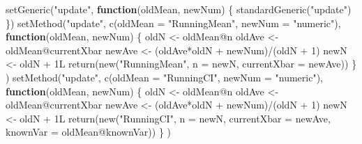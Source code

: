 \documentclass[
  12pt,
  krantz2]{krantz}
\makeatletter
\newenvironment{Shaded}{\begin{snugshade}}{\end{snugshade}}
\newcommand{\AttributeTok}[1]{\textcolor[rgb]{0.61,0.61,0.61}{#1}}
\newcommand{\ControlFlowTok}[1]{\textcolor[rgb]{0.27,0.27,0.27}{\textbf{#1}}}
\newcommand{\DecValTok}[1]{\textcolor[rgb]{0.06,0.06,0.06}{#1}}
\newcommand{\FunctionTok}[1]{\textcolor[rgb]{0,0,0}{#1}}
\newcommand{\NormalTok}[1]{#1}
\newcommand{\OtherTok}[1]{\textcolor[rgb]{0.37,0.37,0.37}{#1}}
\newcommand{\SpecialCharTok}[1]{\textcolor[rgb]{0,0,0}{#1}}
\newcommand{\StringTok}[1]{\textcolor[rgb]{0.5,0.5,0.5}{#1}}
\newenvironment{kframe}{%
\medskip{}
\setlength{\fboxsep}{.8em}
 \def\at@end@of@kframe{}%
 \ifinner\ifhmode%
  \def\at@end@of@kframe{\end{minipage}}%
  \begin{minipage}{\columnwidth}%
 \fi\fi%
 \def\FrameCommand##1{\hskip\@totalleftmargin \hskip-\fboxsep
 \colorbox{shadecolor}{##1}\hskip-\fboxsep
     \hskip-\linewidth \hskip-\@totalleftmargin \hskip\columnwidth}%
 \MakeFramed {\advance\hsize-\width
   \@totalleftmargin\z@ \linewidth\hsize
   \@setminipage}}%
 {\par\unskip\endMakeFramed%
 \at@end@of@kframe}
\renewenvironment{Shaded}{\begin{kframe}}{\end{kframe}}
\makeatother
\begin{document}
\begin{Shaded}
\begin{Highlighting}[]
\FunctionTok{setGeneric}\NormalTok{(}\StringTok{"update"}\NormalTok{, }\ControlFlowTok{function}\NormalTok{(oldMean, newNum) \{}
  \FunctionTok{standardGeneric}\NormalTok{(}\StringTok{"update"}\NormalTok{)}
\NormalTok{\})}
\FunctionTok{setMethod}\NormalTok{(}\StringTok{"update"}\NormalTok{,}
          \FunctionTok{c}\NormalTok{(}\AttributeTok{oldMean =} \StringTok{"RunningMean"}\NormalTok{, }\AttributeTok{newNum =} \StringTok{"numeric"}\NormalTok{),}
          \ControlFlowTok{function}\NormalTok{(oldMean, newNum) \{}
\NormalTok{            oldN }\OtherTok{\textless{}{-}}\NormalTok{ oldMean}\SpecialCharTok{@}\NormalTok{n}
\NormalTok{            oldAve }\OtherTok{\textless{}{-}}\NormalTok{ oldMean}\SpecialCharTok{@}\NormalTok{currentXbar}
\NormalTok{            newAve }\OtherTok{\textless{}{-}}\NormalTok{ (oldAve}\SpecialCharTok{*}\NormalTok{oldN }\SpecialCharTok{+}\NormalTok{ newNum)}\SpecialCharTok{/}\NormalTok{(oldN }\SpecialCharTok{+} \DecValTok{1}\NormalTok{)}
\NormalTok{            newN }\OtherTok{\textless{}{-}}\NormalTok{ oldN }\SpecialCharTok{+}\NormalTok{ 1L}
            \FunctionTok{return}\NormalTok{(}\FunctionTok{new}\NormalTok{(}\StringTok{"RunningMean"}\NormalTok{, }\AttributeTok{n =}\NormalTok{ newN, }\AttributeTok{currentXbar =}\NormalTok{ newAve))}
\NormalTok{          \}}
\NormalTok{)}
\FunctionTok{setMethod}\NormalTok{(}\StringTok{"update"}\NormalTok{,}
          \FunctionTok{c}\NormalTok{(}\AttributeTok{oldMean =} \StringTok{"RunningCI"}\NormalTok{, }\AttributeTok{newNum =} \StringTok{"numeric"}\NormalTok{),}
          \ControlFlowTok{function}\NormalTok{(oldMean, newNum) \{}
\NormalTok{            oldN }\OtherTok{\textless{}{-}}\NormalTok{ oldMean}\SpecialCharTok{@}\NormalTok{n}
\NormalTok{            oldAve }\OtherTok{\textless{}{-}}\NormalTok{ oldMean}\SpecialCharTok{@}\NormalTok{currentXbar}
\NormalTok{            newAve }\OtherTok{\textless{}{-}}\NormalTok{ (oldAve}\SpecialCharTok{*}\NormalTok{oldN }\SpecialCharTok{+}\NormalTok{ newNum)}\SpecialCharTok{/}\NormalTok{(oldN }\SpecialCharTok{+} \DecValTok{1}\NormalTok{)}
\NormalTok{            newN }\OtherTok{\textless{}{-}}\NormalTok{ oldN }\SpecialCharTok{+}\NormalTok{ 1L}
            \FunctionTok{return}\NormalTok{(}\FunctionTok{new}\NormalTok{(}\StringTok{"RunningCI"}\NormalTok{, }\AttributeTok{n =}\NormalTok{ newN, }\AttributeTok{currentXbar =}\NormalTok{ newAve, }
                       \AttributeTok{knownVar =}\NormalTok{ oldMean}\SpecialCharTok{@}\NormalTok{knownVar))}
\NormalTok{          \}}
\NormalTok{)}
\end{Highlighting}
\end{Shaded}
\end{document}
